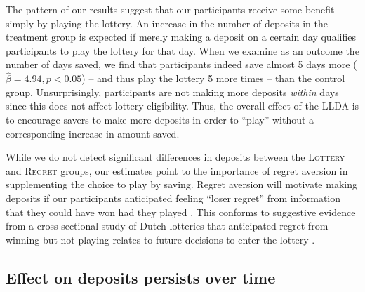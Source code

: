 \documentclass[12pt]{article}
\begin{document}

		The pattern of our results suggest that our participants receive some benefit simply by playing the lottery. An increase in the number of deposits in the treatment group is expected if merely making a deposit on a certain day qualifies participants to play the lottery for that day. When we examine as an outcome the number of days saved, we find that participants indeed save almost 5 days more ($\hat \beta = 4.94, p < 0.05$) -- and thus play the lottery 5 more times -- than the control group. Unsurprisingly, participants are not making more deposits \textit{within} days since this does not affect lottery eligibility. Thus, the overall effect of the LLDA is to encourage savers to make more deposits in order to ``play'' without a corresponding increase in amount saved. %


		While we do not detect significant differences in deposits between the \textsc{Lottery} and \textsc{Regret} groups, our estimates point to the importance of regret aversion in supplementing the choice to play by saving. Regret aversion will motivate making deposits if our participants anticipated feeling ``loser regret'' from information that they could have won had they played . This conforms to suggestive evidence from a cross-sectional study of Dutch lotteries that anticipated regret from winning but not playing relates to future decisions to enter the lottery .


	\subsection{Effect on deposits persists over time}

\end{document}
